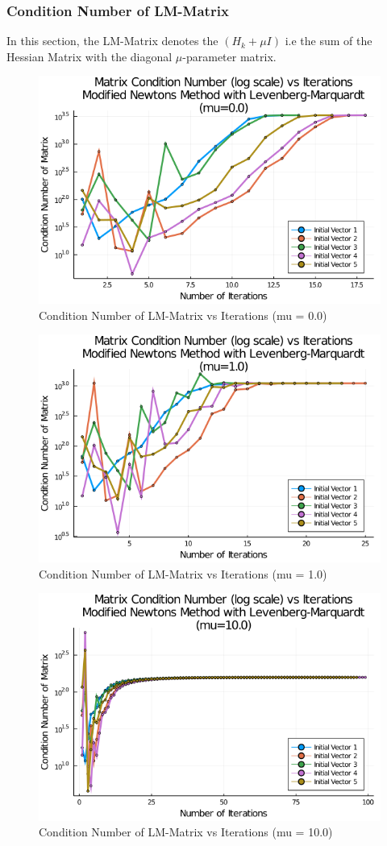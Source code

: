 \documentclass{article}
\begin{document}
    \subsubsection{Condition Number of LM-Matrix}

    In this section, the LM-Matrix denotes the $(H_k + \mu I)$ i.e the sum of the Hessian Matrix with the diagonal $\mu$-parameter matrix.

    \begin{figure}[H]
        \centering
        \includegraphics[width=0.5\linewidth]{./ModifiedNewtons/ModifiedNewtonsWithLM_ConditionNumberHessianPlot_1.png}
        \caption{Condition Number of LM-Matrix vs Iterations (mu = 0.0)}
        \label{fig:ModifiedNewtonsWithLM_ConditionNumberHessianPlot_1.png}
    \end{figure}
    
    \begin{figure}[H]
        \centering
        \includegraphics[width=0.5\linewidth]{./ModifiedNewtons/ModifiedNewtonsWithLM_ConditionNumberHessianPlot_2.png}
        \caption{Condition Number of LM-Matrix vs Iterations (mu = 1.0)}
        \label{fig:ModifiedNewtonsWithLM_ConditionNumberHessianPlot_2.png}
    \end{figure}
    
    \begin{figure}[H]
        \centering
        \includegraphics[width=0.5\linewidth]{./ModifiedNewtons/ModifiedNewtonsWithLM_ConditionNumberHessianPlot_3.png}
        \caption{Condition Number of LM-Matrix vs Iterations (mu = 10.0)}
        \label{fig:ModifiedNewtonsWithLM_ConditionNumberHessianPlot_3.png}
    \end{figure}
\end{document}
